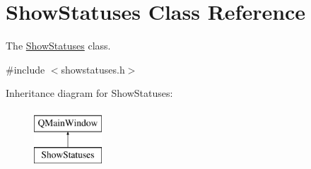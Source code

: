 \hypertarget{class_show_statuses}{}\section{Show\+Statuses Class Reference}
\label{class_show_statuses}


The \hyperlink{class_show_statuses}{Show\+Statuses} class.  




{\ttfamily \#include $<$showstatuses.\+h$>$}

Inheritance diagram for Show\+Statuses\+:\begin{figure}[H]
\begin{center}
\leavevmode
\includegraphics[height=2.000000cm]{class_show_statuses}
\end{center}
\end{figure}
